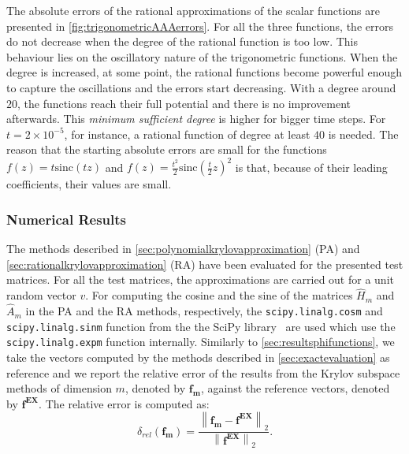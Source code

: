 The absolute errors of the rational approximations of the scalar functions are presented in
\autoref{fig:trigonometricAAAerrors}.
For all the three functions, the errors do not decrease when the degree of the rational function is too low.
This behaviour lies on the oscillatory nature of the trigonometric functions. When the degree is increased,
at some point, the rational functions become powerful enough to capture the oscillations and the errors
start decreasing. With a degree around $20$, the functions reach their full potential and there is no
improvement afterwards. This \textit{minimum sufficient degree} is higher for bigger time steps.
For $t = 2 \times 10^{-5}$, for instance, a rational function of degree at least $40$ is needed.
The reason that the starting absolute errors are small for the functions
$f(z)=t \mathrm{sinc}(tz)$ and $f(z)=\frac{t^2}{2} \mathrm{sinc}(\frac{t}{2}z)^2$
is that, because of their leading coefficients, their values are small.

\FloatBarrier

\subsubsection*{Numerical Results}

The methods described in \autoref{sec:polynomialkrylovapproximation} (PA)
and \autoref{sec:rationalkrylovapproximation} (RA) have been evaluated for the presented test matrices.
For all the test matrices, the approximations are carried out for a unit random vector $v$.
For computing the cosine and the sine of the matrices $\hat{H}_m$ and $\hat{A}_m$ in the PA and the
RA methods, respectively, the \texttt{scipy.linalg.cosm} and \texttt{scipy.linalg.sinm} function
from the the SciPy library~\cite{SciPy2020} are used which use the \texttt{scipy.linalg.expm}
function internally.
Similarly to \autoref{sec:resultsphifunctions}, we take the vectors computed by the methods
described in \autoref{sec:exactevaluation} as reference and we report the relative
error of the results from the Krylov subspace methods of dimension $m$, denoted by
$\mathbf{f_m}$, against the reference vectors, denoted by $\mathbf{f^{EX}}$.
The relative error is computed as:
\begin{equation*}
    \delta_{rel}(\mathbf{f_m}) =
    \frac{\left\| \mathbf{f_m} - \mathbf{f^{EX}} \right\|_2}
    {\left\| \mathbf{f^{EX}} \right\|_2}.
\end{equation*}


